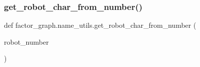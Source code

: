 \subsubsection{\texorpdfstring{get\+\_\+robot\+\_\+char\+\_\+from\+\_\+number()}{get\_robot\_char\_from\_number()}}
{\footnotesize\ttfamily def factor\+\_\+graph.\+name\+\_\+utils.\+get\+\_\+robot\+\_\+char\+\_\+from\+\_\+number (\begin{DoxyParamCaption}\item[{}]{robot\+\_\+number }\end{DoxyParamCaption})}
